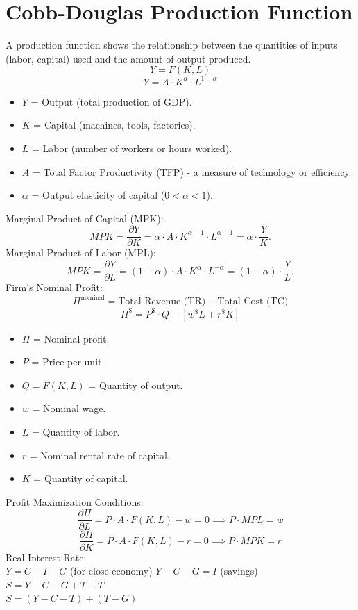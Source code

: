 \documentclass[a4paper, 11pt]{article}
\begin{document}
\section{Cobb-Douglas Production Function}
A production function shows the relationship between the quantities of inputs (labor, capital) used and the amount of output produced.
\[
Y = F(K, L)
\]
\[
Y = A \cdot K^\alpha \cdot L^{1-\alpha}
\]
\begin{itemize}
    \item $Y$ = Output (total production of GDP).
    \item $K$ = Capital (machines, tools, factories).
    \item $L$ = Labor (number of workers or hours worked).
    \item $A$ = Total Factor Productivity (TFP) - a measure of technology or efficiency.
    \item $\alpha$ = Output elasticity of capital ($0 < \alpha < 1$).
\end{itemize}
Marginal Product of Capital (MPK):
\[
MPK = \frac{\partial Y}{\partial K} = \alpha \cdot A \cdot K^{\alpha-1} \cdot L^{\alpha - 1} = \alpha \cdot \frac{Y}{K}.
\]
Marginal Product of Labor (MPL):
\[
MPK = \frac{\partial Y}{\partial L} = (1 - \alpha) \cdot A \cdot K^{\alpha} \cdot L^{-\alpha} = (1-\alpha) \cdot \frac{Y}{L}.
\]
Firm's Nominal Profit:
\[
\Pi^\text{nominal} = \text{Total Revenue (TR)} - \text{Total Cost (TC)}
\]
\[
\Pi^\$ = P^\$ \cdot Q - [w^\$L+r^\$K]
\]
\begin{itemize}
    \item $\Pi$ = Nominal profit.
    \item $P$ = Price per unit.
    \item $Q = F(K,L)$ = Quantity of output.
    \item $w$ = Nominal wage.
    \item $L$ = Quantity of labor.
    \item $r$ = Nominal rental rate of capital.
    \item $K$ = Quantity of capital.
\end{itemize}
Profit Maximization Conditions:
\[
\frac{\partial \Pi}{\partial L} = P \cdot A \cdot F(K,L) - w = 0 \implies P \cdot MPL = w
\]
\[
\frac{\partial \Pi}{\partial K} = P \cdot A \cdot F(K,L) - r = 0 \implies P \cdot MPK = r
\]
Real Interest Rate: \\
$Y = C + I + G$ (for close economy)
$Y - C - G = I$ (savings) \\
$S = Y - C - G + T - T$ \\
$S = (Y - C - T) + (T - G)$
\end{document}

